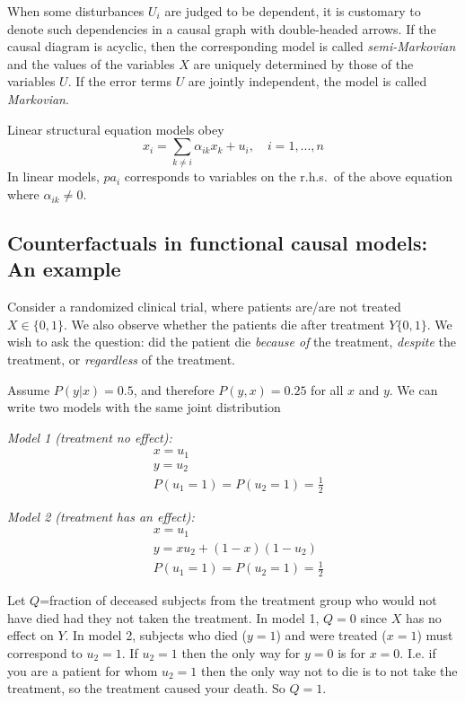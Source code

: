 \documentclass[11pt]{article}
\numberwithin{equation}{section}
\begin{document}
When some disturbances $U_i$ are judged to be dependent, it is customary to denote such dependencies in a causal graph with double-headed arrows. If the causal diagram is acyclic, then the corresponding model is called \textit{semi-Markovian} and the values of the variables $X$ are uniquely determined by those of the variables $U$. If the error terms $U$ are jointly independent, the model is called \textit{Markovian}.

Linear structural equation models obey
\begin{equation}
x_i = \sum_{k \neq i} \alpha_{ik} x_k + u_i, \quad i=1,...,n 
\end{equation}
In linear models, $pa_i$ corresponds to variables on the r.h.s.\ of the above equation where $\alpha_{ik} \neq 0$.

\subsection{Counterfactuals in functional causal models: An example}
Consider a randomized clinical trial, where patients are/are not treated $X \in \{0,1\}$. We also observe whether the patients die after treatment $Y\{0,1\}$. We wish to ask the question: did the patient die \textit{because of} the treatment, \textit{despite} the treatment, or \textit{regardless} of the treatment.

Assume $P(y|x) = 0.5$, and therefore $P(y,x)=0.25$ for all $x$ and $y$. We can write two models with the same joint distribution

\textit{Model 1 (treatment no effect):}
\begin{align}
&x=u_1\\
&y=u_2\\
&P(u_1=1) = P(u_2=1)= \frac{1}{2}
\end{align}


\textit{Model 2 (treatment has an effect):}
\begin{align}
&x=u_1\\
&y=xu_2 + (1-x)(1-u_2)\\
&P(u_1=1) = P(u_2=1)= \frac{1}{2}
\end{align}

Let $Q$=fraction of deceased subjects from the treatment group who would not have died had they not taken the treatment. In model 1, $Q=0$ since $X$ has no effect on $Y$. In model 2, subjects who died ($y=1$) and were treated ($x=1$) must correspond to $u_2=1$. If $u_2=1$ then the only way for $y=0$ is for $x=0$. I.e. if you are a patient for whom $u_2=1$ then the only way not to die is to not take the treatment, so the treatment caused your death. So $Q=1$.
\end{document}
